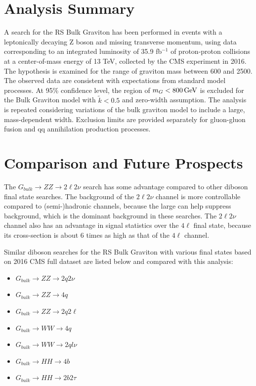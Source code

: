 \section{Analysis Summary}
A search for the RS Bulk Graviton has been performed in events with a leptonically decaying Z boson and missing transverse momentum, using data corresponding to an integrated luminosity of 35.9 fb$^{-1}$ of proton-proton collisions at a center-of-mass energy of 13 TeV, collected by the CMS experiment in 2016. The hypothesis is examined for the range of graviton mass between 600 and 2500\GeV. The observed data are consistent with expectations from standard model processes. At 95\% confidence level, the region of $m_G <800\,\text{Ge\hspace{-.08em}V}$ is excluded for the Bulk Graviton model with $\tilde{k}<0.5$ and zero-width assumption. The analysis is repeated considering variations of the bulk graviton model to include a large, mass-dependent width. Exclusion limits are provided separately for gluon-gluon fusion and qq annihilation production processes.

\section{Comparison and Future Prospects}
The $G_{bulk}\rightarrow ZZ\rightarrow 2\ell 2\nu$ search has some advantage compared to other diboson final state searches. The background of the $2\ell2\nu$ channel is more controllable compared to (semi-)hadronic channels, because the large \ptmiss can help suppress \Zjets background, which is the dominant background in these searches. The $2\ell2\nu$ channel also has an advantage in signal statistics over the $4\ell$ final state, because its cross-section is about 6 times as high as that of the $4\ell$ channel.

\vspace{0.3cm}
Similar diboson searches for the RS Bulk Graviton with various final states based on 2016 CMS full dataset are listed below and compared with this analysis:
\begin{itemize}
\item $G_{bulk}\rightarrow ZZ\rightarrow 2q 2\nu$~\cite{sum_zzqqnn}
\item $G_{bulk}\rightarrow ZZ\rightarrow 4q$~\cite{sum_vv4q}
\item $G_{bulk}\rightarrow ZZ\rightarrow 2q 2\ell$~\cite{sum_zzqqll}
\item $G_{bulk}\rightarrow WW\rightarrow 4q$~\cite{sum_vv4q}
\item $G_{bulk}\rightarrow WW\rightarrow 2ql\nu$~\cite{sum_wwqqln}
\item $G_{bulk}\rightarrow HH\rightarrow 4b$~\cite{sum_hh4b}
\item $G_{bulk}\rightarrow HH\rightarrow 2b 2\tau$~\cite{sum_hh2b2t}
\end{itemize}

